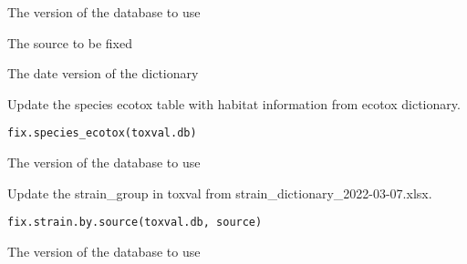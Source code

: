 \documentclass[letterpaper]{book}
\begin{document}
%
\begin{Arguments}
\begin{ldescription}
\item[\code{toxval.db}] The version of the database to use

\item[\code{source}] The source to be fixed

\item[\code{date\_string}] The date version of the dictionary
\end{ldescription}
\end{Arguments}
%
\begin{Description}\relax
Update the species ecotox table with habitat information from ecotox dictionary.
\end{Description}
%
\begin{Usage}
\begin{verbatim}
fix.species_ecotox(toxval.db)
\end{verbatim}
\end{Usage}
%
\begin{Arguments}
\begin{ldescription}
\item[\code{toxval.db}] The version of the database to use
\end{ldescription}
\end{Arguments}
%
\begin{Description}\relax
Update the strain\_group in toxval from strain\_dictionary\_2022-03-07.xlsx.
\end{Description}
%
\begin{Usage}
\begin{verbatim}
fix.strain.by.source(toxval.db, source)
\end{verbatim}
\end{Usage}
%
\begin{Arguments}
\begin{ldescription}
\item[\code{toxval.db}] The version of the database to use
\end{ldescription}
\end{Arguments}
\end{document}
